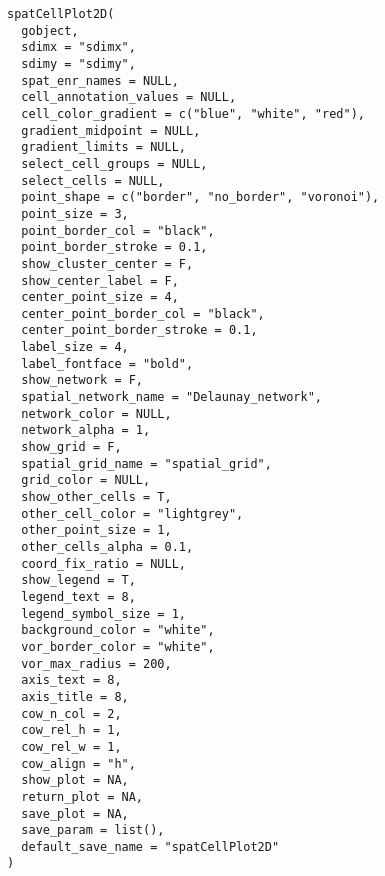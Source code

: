 \documentclass[a4paper]{book}
\begin{document}
\begin{Usage}
\begin{verbatim}
spatCellPlot2D(
  gobject,
  sdimx = "sdimx",
  sdimy = "sdimy",
  spat_enr_names = NULL,
  cell_annotation_values = NULL,
  cell_color_gradient = c("blue", "white", "red"),
  gradient_midpoint = NULL,
  gradient_limits = NULL,
  select_cell_groups = NULL,
  select_cells = NULL,
  point_shape = c("border", "no_border", "voronoi"),
  point_size = 3,
  point_border_col = "black",
  point_border_stroke = 0.1,
  show_cluster_center = F,
  show_center_label = F,
  center_point_size = 4,
  center_point_border_col = "black",
  center_point_border_stroke = 0.1,
  label_size = 4,
  label_fontface = "bold",
  show_network = F,
  spatial_network_name = "Delaunay_network",
  network_color = NULL,
  network_alpha = 1,
  show_grid = F,
  spatial_grid_name = "spatial_grid",
  grid_color = NULL,
  show_other_cells = T,
  other_cell_color = "lightgrey",
  other_point_size = 1,
  other_cells_alpha = 0.1,
  coord_fix_ratio = NULL,
  show_legend = T,
  legend_text = 8,
  legend_symbol_size = 1,
  background_color = "white",
  vor_border_color = "white",
  vor_max_radius = 200,
  axis_text = 8,
  axis_title = 8,
  cow_n_col = 2,
  cow_rel_h = 1,
  cow_rel_w = 1,
  cow_align = "h",
  show_plot = NA,
  return_plot = NA,
  save_plot = NA,
  save_param = list(),
  default_save_name = "spatCellPlot2D"
)
\end{verbatim}
\end{Usage}
%
\end{document}
